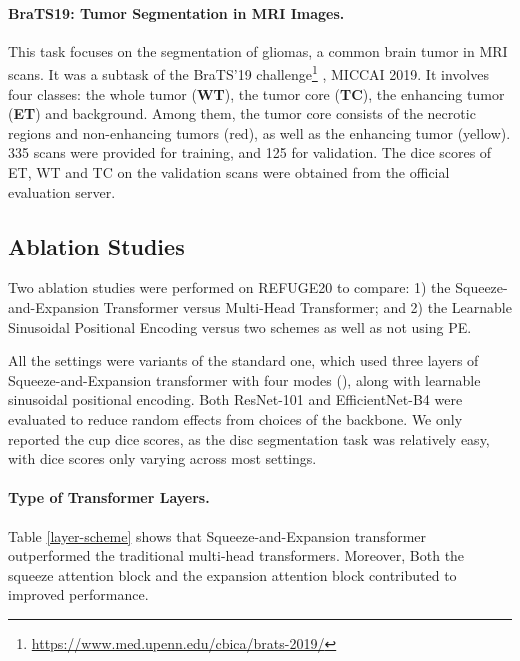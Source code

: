 \documentclass{article}
\begin{document}
\paragraph{BraTS19: Tumor Segmentation in MRI Images.}
This task focuses on the segmentation of gliomas, a common brain tumor in MRI scans. It was a subtask of the BraTS'19 challenge\footnote{\url{https://www.med.upenn.edu/cbica/brats-2019/}}  \cite{brats-tmi,brats-sci-data}, MICCAI 2019. It involves four classes: the whole tumor (\textbf{WT}), the tumor core (\textbf{TC}), the enhancing tumor (\textbf{ET}) and background. Among them, the tumor core consists of the necrotic regions and non-enhancing tumors (red), as well as the enhancing tumor (yellow). 335 scans were provided for training, and 125 for validation. The dice scores of ET, WT and TC on the validation scans were obtained from the official evaluation server.

\subsection{Ablation Studies}
Two ablation studies were performed on REFUGE20 to compare: 1) the Squeeze-and-Expansion Transformer versus Multi-Head Transformer; and 2) the Learnable Sinusoidal Positional Encoding versus two schemes as well as not using PE.

All the settings were variants of the standard one, which used three layers of Squeeze-and-Expansion transformer with four modes (), along with learnable sinusoidal positional encoding. Both ResNet-101 and EfficientNet-B4 were evaluated to reduce random effects from choices of the backbone. We only reported the cup dice scores, as the disc segmentation task was relatively easy, with dice scores only varying  across most settings. 

\paragraph{Type of Transformer Layers.}
Table \ref{layer-scheme} shows that Squeeze-and-Expansion transformer outperformed the traditional multi-head transformers. Moreover, Both the squeeze attention block and the expansion attention block contributed to improved performance.
\end{document}
